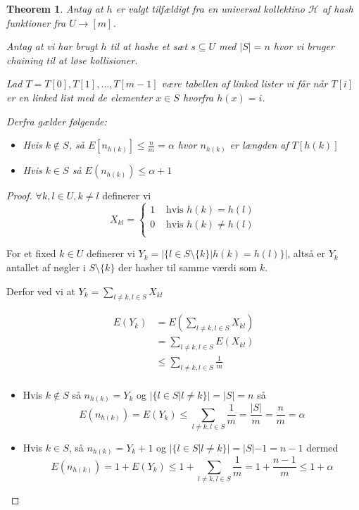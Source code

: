 \documentclass[11pt]{article}
\newtheorem{theorem}{Theorem}
\theoremstyle{definition}
\theoremstyle{remark}
\begin{document}
\begin{theorem}
  Antag at $h$ er valgt tilfældigt fra en universal kollektino $\mathcal{H}$ af hash funktioner fra $U \rightarrow [m]$.

  Antag at vi har brugt $h$ til at hashe et sæt $s \subseteq U$ med $|S| = n$ hvor vi bruger chaining til at løse kollisioner.

  Lad $T = T[0], T[1], \ldots, T[m-1]$ være tabellen af linked lister vi får når $T[i]$ er en linked list med de elementer $x \in S$ hvorfra $h(x) = i$.

  Derfra gælder følgende:
  \begin{itemize}
  \item Hvis $k \notin S$, så $E[n_{h(k)}] \leq \frac{n}{m} = \alpha$ hvor $n_{h(k)}$ er længden af $T[h(k)]$
  \item Hvis $k \in S$ så $E(n_{h(k)}) \leq \alpha + 1$
    \end{itemize}
 \end{theorem}

\begin{proof}
  $\forall k, l \in U, k \neq l$ definerer vi
  \[
    X_{kl} = \begin{cases}
      1 & \text{ hvis } h(k) = h(l) \\
      0 & \text{ hvis } h(k) \neq h(l) \\
      \end{cases}
  \]

  For et fixed $k \in U$ definerer vi $Y_{k} = |\{ l \in S \setminus \{k\} | h(k) = h(l) \}|$, altså er $Y_{k}$
  antallet af nøgler i $S \setminus \{k\}$ der hasher til samme værdi som $k$.

  Derfor ved vi at $Y_k = \sum_{l \neq k, l \in S} X_{kl}$


  \begin{equation}
    \begin{split}
      E(Y_{k}) &= E( \sum_{l \neq k, l \in S} X_{kl}) \\
               &= \sum_{l \neq k, l \in S} E(X_{kl}) \\
               &\leq \sum_{l \neq k, l \in S} \frac{1}{m}\\
    \end{split}
  \end{equation}

  \begin{itemize}
   \item Hvis $k \notin S$ så $n_{h(k)} = Y_{k}$  og $|\{l \in S | l \neq k\}| = |S| = n$ så \[ E(n_{h(k)}) = E(Y_{k}) \leq \sum_{l \neq k, l \in S} \frac{1}{m} = \frac{|S|}{m} = \frac{n}{m} = \alpha \]
   \item Hvis $k \in S$, så $n_{h(k)} = Y_{k}+1$ og $|\{l \in S | l \neq k\}| = |S|-1  = n - 1$ dermed \[ E(n_{h(k)}) = 1 + E(Y_{k}) \leq 1 + \sum_{l \neq k, l \in S} \frac{1}{m} = 1 + \frac{n-1}{m} \leq 1 + \alpha \]
  \end{itemize}
  
\end{proof}
\end{document}
